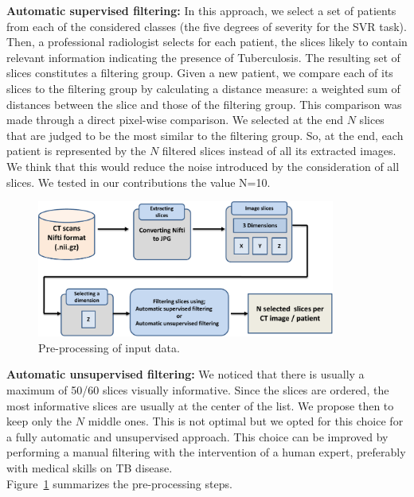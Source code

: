 \documentclass{llncs}
\begin{document}
\textbf{Automatic supervised filtering:} In this approach, we select a set of patients from each of the considered classes (the five degrees of severity for the SVR task). Then, a professional radiologist selects for each patient, the slices likely to contain relevant information indicating the presence of Tuberculosis. The resulting set of slices constitutes a filtering group. Given a new patient, we compare each of its slices to the filtering group by calculating a distance measure:  a weighted sum of distances between the slice and those of the filtering group. This comparison was made through a direct pixel-wise comparison. We selected at the end $N$ slices that are judged to be the most similar to the filtering group. So, at the end, each patient is represented by the $N$ filtered slices instead of all its extracted images. We think that this would reduce the noise introduced by the consideration of all slices. We tested in our contributions the value N=10.

\begin{figure}
\includegraphics[width=\textwidth,height=4.5cm]{preprocess.pdf}
\caption{Pre-processing of input data.} 
\label{fig:preprocess}
\end{figure}

\textbf{Automatic unsupervised filtering:}
We noticed that there is usually a maximum of 50/60 slices visually informative. Since the slices are ordered, the most informative slices are usually at the center of the list. We propose then to keep only the $N$ middle ones. This is not optimal but we opted for this choice for a fully automatic and unsupervised approach. This choice can be improved by performing a manual filtering with the intervention of a human expert, preferably with medical skills on TB disease.\\

Figure~\ref{fig:preprocess} summarizes the pre-processing steps.

 
\end{document}
